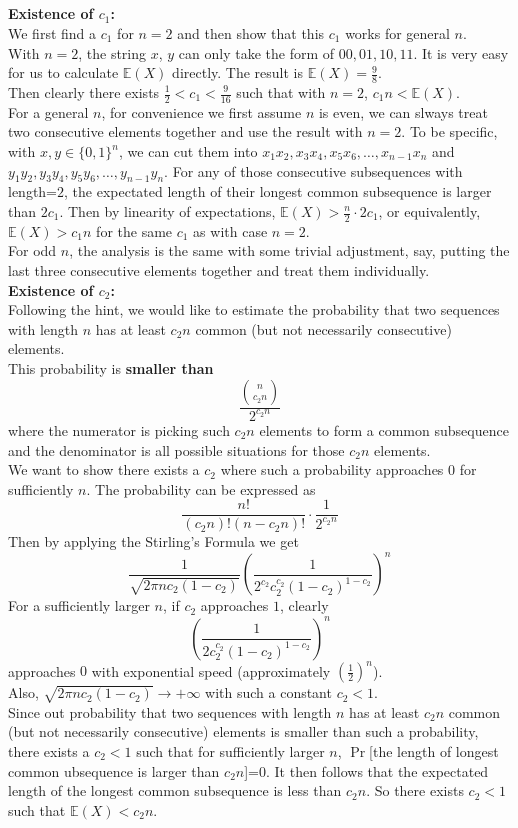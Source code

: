\documentclass[12pt,letterpaper]{article}
\begin{document}
\subsection{}
\textbf{Existence of $c_1$:}\\
We first find a $c_1$ for $n=2$ and then show that this $c_1$ works for general $n$.\\
With $n=2$, the string $x$, $y$ can only take the form of $00,01,10,11$.
It is very easy for us to calculate $\mathbb{E}(X)$ directly.
The result is $\mathbb{E}(X)=\frac{9}{8}$.\\
Then clearly there exists $\frac{1}{2}<c_1<\frac{9}{16}$ such that with $n=2$, $c_1n<\mathbb{E}(X)$.\\
For a general $n$, for convenience we first assume $n$ is even,
we can slways treat two consecutive elements together and use the result with $n=2$.
To be specific, with $x,y\in\{0,1\}^{n}$,
we can cut them into $x_1x_2,x_3x_4,x_5x_6,\dots,x_{n-1}x_n$ and $y_1y_2,y_3y_4,y_5y_6,\dots,y_{n-1}y_n$.
For any of those consecutive subsequences with length=$2$,
the expectated length of their longest common subsequence is larger than $2c_1$.
Then by linearity of expectations, $\mathbb{E}(X)>\frac{n}{2}\cdot 2c_1$,
or equivalently, $\mathbb{E}(X)>c_1n$ for the same $c_1$ as with case $n=2$.\\
For odd $n$, the analysis is the same with some trivial adjustment, say, 
putting the last three consecutive elements together and treat them individually.\\
\textbf{Existence of $c_2$:}\\
Following the hint, we would like to estimate the probability that 
two sequences with length $n$ has at least $c_2n$ common (but not necessarily consecutive) elements.\\
This probability is \textbf{smaller than}
$$\frac{\binom{n}{c_2n}}{2^{c_2n}}$$
where the numerator is picking such $c_2n$ elements to form a common subsequence
and the denominator is all possible situations for those $c_2n$ elements.\\
We want to show there exists a $c_2$ where such a probability approaches $0$ for sufficiently $n$.
The probability can be expressed as 
$$\frac{n!}{(c_2n)!(n-c_2n)!}\cdot\frac{1}{2^{c_2n}}$$
Then by applying the Stirling's Formula we get 
$$\frac{1}{\sqrt{2\pi nc_2(1-c_2)}}\left(\frac{1}{2^{c_2}c_{2}^{c_2}(1-c_2)^{1-c_2}}\right)^n$$
For a sufficiently larger $n$, 
if $c_2$ approaches $1$, clearly
$$\left(\frac{1}{2c_{2}^{c_2}(1-c_2)^{1-c_2}}\right)^n$$ 
approaches $0$ with exponential speed (approximately $(\frac{1}{2})^n$).\\
Also, $\sqrt{2\pi n c_2(1-c_2)}\to+\infty$ with such a constant $c_2<1$.\\
Since out probability that two sequences with length $n$ has at least $c_2n$ common (but not necessarily consecutive) elements
is smaller than such a probability,
there exists a $c_2<1$ such that for sufficiently larger $n$, 
$\Pr$[the length of longest common ubsequence is larger than $c_2n$]=0.
It then follows that the expectated length of the longest common subsequence is less than $c_2n$.
So there exists $c_2<1$ such that $\mathbb{E}(X)<c_2n$.
\end{document}
